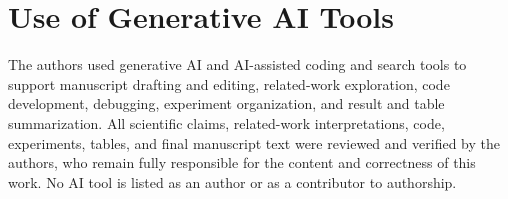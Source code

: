 \section*{Use of Generative AI Tools}

The authors used generative AI and AI-assisted coding and search tools to support manuscript drafting and editing, related-work exploration, code development, debugging, experiment organization, and result and table summarization. All scientific claims, related-work interpretations, code, experiments, tables, and final manuscript text were reviewed and verified by the authors, who remain fully responsible for the content and correctness of this work. No AI tool is listed as an author or as a contributor to authorship.
